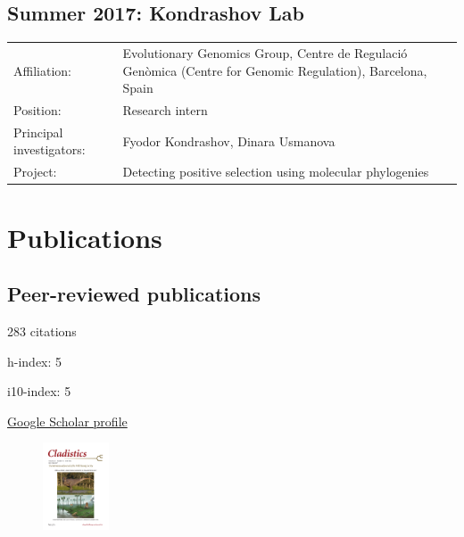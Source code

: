 \documentclass[10pt]{article}
\begin{document}
\subsection*{Summer 2017: Kondrashov Lab}

\begin{tabularx}{\textwidth}{>{\raggedleft\arraybackslash}p{3.6cm} X}
Affiliation: & Evolutionary Genomics Group, Centre de Regulaci\'{o} Gen\`{o}mica (Centre for Genomic Regulation), Barcelona, Spain \\[0.1cm]
Position: & Research intern \\[0.1cm]
Principal investigators: & Fyodor Kondrashov, Dinara Usmanova \\[0.1cm]
Project: & Detecting positive selection using molecular phylogenies \\[0.1cm]
\end{tabularx}

\section*{Publications}

\subsection*{Peer-reviewed publications}

\begin{center}
  \begin{itemize*}
    \item 283 citations \hspace*{1cm}
    \item h-index: 5 \hspace*{1cm}
    \item i10-index: 5 \hspace*{1cm}
    \item \href{https://scholar.google.com/citations?user=LFXFNAMAAAAJ}{Google Scholar profile}
  \end{itemize*}
\end{center}

\begin{figure}
 \vspace*{-1.5cm}
 \begin{center}
   \includegraphics[width=0.175\textwidth]{CladisticsCover.pdf}
 \end{center}
\end{figure}
\end{document}
